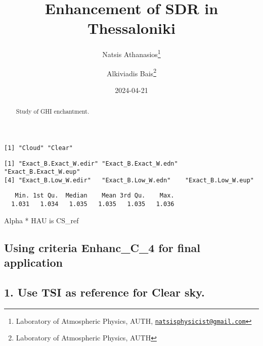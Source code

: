 \documentclass[
  10pt,
  a4paper,oneside]{article}
\title{Enhancement of SDR in Thessaloniki}
\author{Natsis Athanasios\footnote{Laboratory of Atmospheric Physics, AUTH, \href{mailto:natsisphysicist@gmail.com}{\nolinkurl{natsisphysicist@gmail.com}}} \and Alkiviadis Bais\footnote{Laboratory of Atmospheric Physics, AUTH}}
\date{2024-04-21}
\begin{document}
\maketitle
\begin{abstract}
Study of GHI enchantment.
\end{abstract}

{
\hypersetup{linkcolor=}
\setcounter{tocdepth}{4}
\tableofcontents
}
\begin{verbatim}
[1] "Cloud" "Clear"
\end{verbatim}

\begin{verbatim}
[1] "Exact_B.Exact_W.edir" "Exact_B.Exact_W.edn"  "Exact_B.Exact_W.eup" 
[4] "Exact_B.Low_W.edir"   "Exact_B.Low_W.edn"    "Exact_B.Low_W.eup"   
\end{verbatim}

\begin{verbatim}
   Min. 1st Qu.  Median    Mean 3rd Qu.    Max. 
  1.031   1.034   1.035   1.035   1.035   1.036 
\end{verbatim}

Alpha * HAU is CS\_ref

\hypertarget{using-criteria-enhanc_c_4-for-final-application}{%
\subsection{\texorpdfstring{Using criteria \textbf{Enhanc\_C\_4} for final application}{Using criteria Enhanc\_C\_4 for final application}}\label{using-criteria-enhanc_c_4-for-final-application}}

\hypertarget{use-tsi-as-reference-for-clear-sky.}{%
\subsection{1. Use TSI as reference for Clear sky.}\label{use-tsi-as-reference-for-clear-sky.}}
\end{document}

